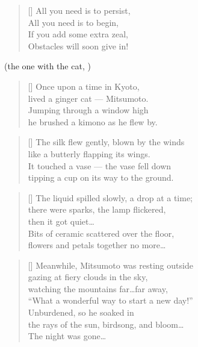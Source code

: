 \begin{multicols}{2}
	\begin{verse}[\versewidth]
		All you need is to persist,\\
		All you need is to begin,\\
		If you add some extra zeal,\\
		Obstacles will soon give in!
	\end{verse}
	
	
\end{multicols}

\clearpage
\PlainPoemTitle
{}
\vspace{-5mm}
\begin{center}
	(the one with the cat, )
\end{center}

\begin{multicols}{2}
	\begin{verse}[\versewidth]
		Once upon a time in Kyoto,\\
		lived a ginger cat --- Mitsumoto.\\
		Jumping through a window high\\
		he brushed a kimono as he flew by.
	\end{verse}
	
	\begin{verse}[\versewidth]
		The silk flew gently, blown by the winds\\
		like a butterly flapping its wings.\\
		It touched a vase --- the vase fell down\\
		tipping a cup on its way to the ground.
	\end{verse}
	
	\begin{verse}[\versewidth]
		The liquid spilled slowly, a drop at a time;\\
		there were sparks, the lamp flickered,\\
		then it got quiet\ldots\\
		Bits of ceramic scattered over the floor,\\
		flowers and petals together no more\ldots
	\end{verse}
	
	
	\begin{verse}[\versewidth]
		Meanwhile, Mitsumoto was resting outside\\
		gazing at fiery clouds in the sky,\\
		watching the mountains far\ldots far away,\\
		``What a wonderful way to start a new day!''\\
		Unburdened, so he soaked in\\
		the rays of the sun, birdsong, and bloom\ldots\\
		The night was gone\ldots
	\end{verse}
	


\end{multicols}

